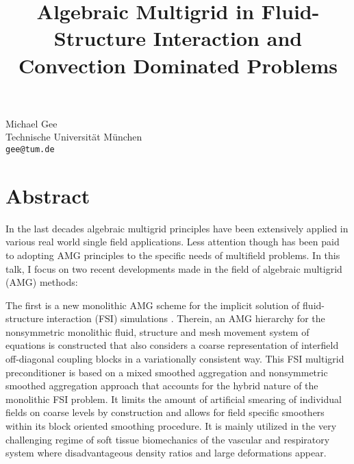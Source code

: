 \title{Algebraic Multigrid in Fluid-Structure Interaction and Convection Dominated Problems}
\author{}  \institute{}
\maketitle
\begin{center}
{\large Michael Gee}\\
Technische Universit\"at M\"unchen\\
{\tt gee@tum.de}

\end{center}

\section*{Abstract}

In the last decades algebraic multigrid principles have been extensively
applied in various real world single field applications. Less attention though has been paid to adopting AMG principles to the specific needs of multifield problems. In this talk, I
focus on two recent developments made in the field of algebraic
multigrid (AMG) methods:

The first is a new monolithic AMG scheme for the implicit solution
of fluid-structure interaction (FSI) simulations
\cite{geekuettlerwall}. Therein, an AMG hierarchy for the
nonsymmetric monolithic fluid, structure and mesh movement system of
equations is constructed that also considers a coarse representation
of interfield off-diagonal coupling blocks in a variationally
consistent way. This  FSI multigrid preconditioner is based on a
mixed smoothed aggregation and
nonsymmetric smoothed aggregation approach \cite{SalaTuminaro,wiesnertuminarogee} that
accounts for the hybrid nature of the monolithic FSI problem. It
limits the amount of artificial smearing of individual fields on
coarse levels by construction and allows for field specific
smoothers within its block oriented smoothing procedure. It is
mainly utilized in the very challenging regime of soft tissue
biomechanics of the vascular and respiratory system where
disadvantageous density ratios and large deformations appear.

